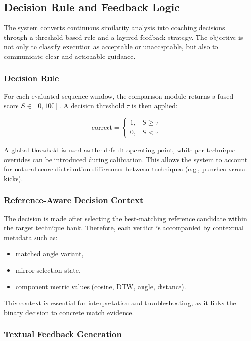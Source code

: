 \documentclass[12pt]{article}
\begin{document}
{\subsection{Decision Rule and Feedback Logic}

The system converts continuous similarity analysis into coaching decisions through a threshold-based rule and a layered feedback strategy. The objective is not only to classify execution as acceptable or unacceptable, but also to communicate clear and actionable guidance.

\subsubsection{Decision Rule}

For each evaluated sequence window, the comparison module returns a fused score \(S \in [0,100]\). A decision threshold \(\tau\) is then applied:

\[
\text{correct}=
\begin{cases}
1, & S \ge \tau \\
0, & S < \tau
\end{cases}
\]

A global threshold is used as the default operating point, while per-technique overrides can be introduced during calibration. This allows the system to account for natural score-distribution differences between techniques (e.g., punches versus kicks).

\subsubsection{Reference-Aware Decision Context}

The decision is made after selecting the best-matching reference candidate within the target technique bank. Therefore, each verdict is accompanied by contextual metadata such as:

\begin{itemize}
    \item matched angle variant,
    \item mirror-selection state,
    \item component metric values (cosine, DTW, angle, distance).
\end{itemize}

This context is essential for interpretation and troubleshooting, as it links the binary decision to concrete match evidence.

\subsubsection{Textual Feedback Generation}

}
\end{document}
